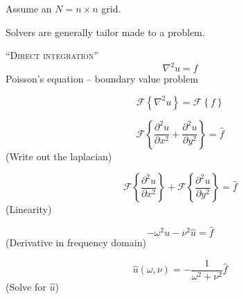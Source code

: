\documentclass[14pt]{beamer}
\begin{document}
\begin{frame}
    \centering
    Assume an $N = n \times n$ grid.\\[1em]

    \scriptsize
\end{frame}

\begin{frame}
    \centering
    Solvers are generally tailor made to a problem.\\[1em]

    \tiny
\end{frame}

\begin{frame}
    \centering
    \textsc{``Direct integration''}
    $$
    \nabla^2 u = f
    $$
    \tiny Poisson's equation -- boundary value problem
\end{frame}

\begin{frame}
    \centering
    $$
    \mathscr{F} \left\{ \nabla^2 u \right\} = \mathscr{F}\left\{f\right\}
    $$
\end{frame}

\begin{frame}
    \centering
    $$
    \mathscr{F} \left\{   \frac {\partial^2 u} {\partial x^2}
                        + \frac {\partial^2 u} {\partial y^2}
                \right\} = \hat f
    $$
    \tiny (Write out the laplacian)
\end{frame}

\begin{frame}
    \centering
    $$
      \mathscr{F} \left\{ \frac {\partial^2 u} {\partial x^2} \right\}
    + \mathscr{F} \left\{ \frac {\partial^2 u} {\partial y^2} \right\} = \hat f
    $$
    \tiny (Linearity)
\end{frame}

\begin{frame}
    \centering
    $$
    -\omega^2 \hat u
    - \nu^2 \hat u
    = \hat f
    $$
    \tiny (Derivative in frequency domain)
\end{frame}

\begin{frame}
    \centering
    $$
    \hat u(\omega, \nu) = - \frac 1 {\omega^2 + \nu^2} \hat f
    $$
    \tiny (Solve for $\hat u$)
\end{frame}
\end{document}
